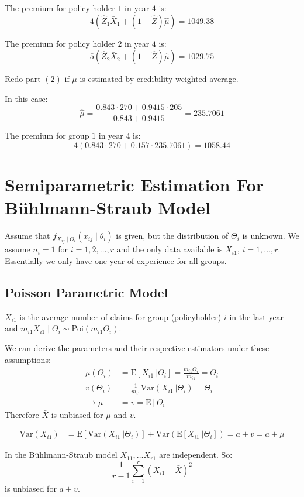 \documentclass[english,12pt]{article}
\theoremstyle{plain}
\theoremstyle{definition}
\theoremstyle{definition} %
\newcommand{\ex}[1]{\mbox{E} \left[ #1 \right]}
\newcommand{\var}[1]{\mbox{Var} \left( #1 \right)}
\newcommand{\condex}[2]{\mbox{E} \left[ \left. #1 \ \right\vert \left. #2 \right. \right]}
\newcommand{\condvar}[2]{\mbox{Var} \left( \left. #1 \ \right\lvert \left. #2 \right. \right)}
\begin{document}
{{The premium for policy holder $1$ in year $4$ is:
\[4(\hat{Z}_1\bar{X}_1+(1-\hat{Z})\hat{\mu})=1049.38\]

The premium for policy holder $2$ in year $4$ is:
\[5(\hat{Z}_2\bar{X}_2+(1-\hat{Z})\hat{\mu})=1029.75\]

\item Redo part $(2)$ if $\mu$ is estimated by credibility weighted average.

In this case:
\[\hat{\mu}=\frac{0.843\cdot 270+0.9415\cdot 205}{0.843+0.9415}=235.7061\]

The premium for group $1$ in year $4$ is:
\[4(0.843\cdot 270+0.157\cdot 235.7061)=1058.44\]
}
}

\section{Semiparametric Estimation For B\"{u}hlmann-Straub Model}
Assume that $f_{X_{ij}\mid\Theta_i}(x_{ij}\mid\theta_i)$ is given, but the distribution of $\Theta_i$ is unknown.  We assume $n_i=1$ for $i=1,2,\ldots,r$ and the only data available is $X_{i1}$, $i=1,\ldots, r$.  Essentially we only have one year of experience for all groups.

\subsection{Poisson Parametric Model}
$X_{i1}$ is the average number of claims for group (policyholder) $i$ in the last year and $m_{i1}X_{i1}\mid\Theta_{i}\sim\text{Poi}(m_{i1}\Theta_i)$.

We can derive the parameters and their respective estimators under these assumptions:
\begin{align*}
\mu(\Theta_i)&=\condex{X_{i1}}{\Theta_i}
=\frac{m_{i1}\Theta_i}{m_{i1}}
=\Theta_i\\
v(\Theta_i)&=\frac{1}{m_{i1}}\condvar{X_{i1}}{\Theta_i}
=\Theta_i\\
\rightarrow \mu&=v =\ex{\Theta_i}
\end{align*}
Therefore $\bar{X}$ is unbiased for $\mu$ and $v$.

\begin{align*}
\var{X_{i1}}&=\ex{\condvar{X_{i1}}{\Theta_i}}+\var{\condex{X_{i1}}{\Theta_i}}
=a+v
=a+\mu
\end{align*}

In the B\"{u}hlmann-Straub model $X_{11},\ldots X_{r1}$ are independent.  So:
\[\frac{1}{r-1}\sum_{i=1}^r(X_{i1}-\bar{X})^2\]
is unbiased for $a+v$.
\end{document}
